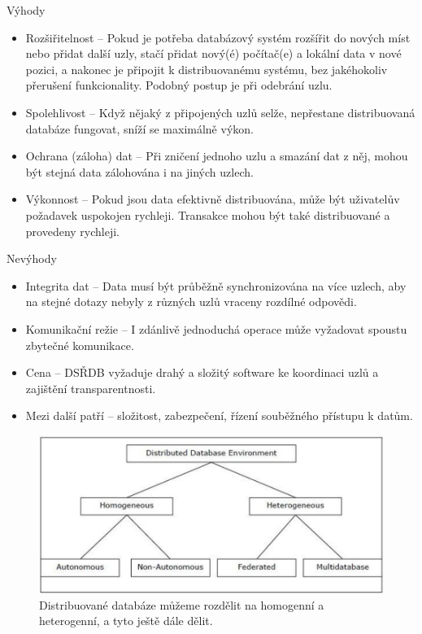 \noindent Výhody
\begin{itemize}
\item Rozšiřitelnost – Pokud je potřeba databázový systém rozšířit do nových míst nebo přidat další uzly, stačí přidat nový(é) počítač(e) a lokální data v nové pozici, a nakonec je připojit k distribuovanému systému, bez jakéhokoliv přerušení funkcionality. Podobný postup je při odebrání uzlu.

\item Spolehlivost – Když nějaký z připojených uzlů selže, nepřestane distribuovaná databáze fungovat, sníží se maximálně výkon.

\item Ochrana (záloha) dat – Při zničení jednoho uzlu a smazání dat z něj, mohou být stejná data zálohována i na jiných uzlech.

\item Výkonnost – Pokud jsou data efektivně distribuována, může být uživatelův požadavek uspokojen rychleji. Transakce mohou být také distribuované a provedeny rychleji. 
\end{itemize}

\noindent Nevýhody
\begin{itemize}
\item Integrita dat – Data musí být průběžně synchronizována na více uzlech, aby na stejné dotazy nebyly z různých uzlů vraceny rozdílné odpovědi.

\item Komunikační režie – I zdánlivě jednoduchá operace může vyžadovat spoustu zbytečné komunikace.

\item Cena – DSŘDB vyžaduje drahý a složitý software ke koordinaci uzlů a zajištění transparentnosti. \cite{distributedDBMS}

\item Mezi další patří – složitost, zabezpečení, řízení souběžného přístupu k datům.
\end{itemize}

\begin{figure}[!h]
  \centering
  \includegraphics[width=15cm]{template-fig/distributed_database_environments.pdf}
  \caption{Distribuované databáze můžeme rozdělit na homogenní a heterogenní, a tyto ještě dále dělit. \cite{distributedDBMS}}
  \label{FIG_DivDistrDB}
\end{figure}

